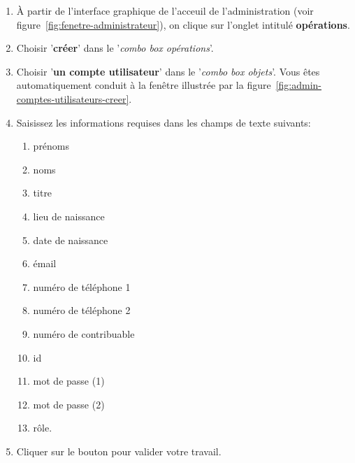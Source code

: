 \begin{enumerate}[1)]
	\item \`A partir de l'interface graphique de l'acceuil de
		l'administration (voir figure~\ref{fig:fenetre-administrateur}),
		on clique sur l'onglet intitul\'e \textbf{op\'erations}. 
		
	\item Choisir '\textbf{cr\'eer}' dans le '\emph{combo box
		op\'erations}'.
		
	\item Choisir '\textbf{un compte utilisateur}' dans
		le '\emph{combo box objets}'. Vous \^etes automatiquement
		conduit \`a la fen\^etre illustr\'ee par la
		figure~\ref{fig:admin-comptes-utilisateurs-creer}.
		
	\item Saisissez les informations requises dans les champs
		de texte suivants:
		\begin{enumerate}[1)]
			\item pr\'enoms
			\item noms
			\item titre			
			\item lieu de naissance \optionel
			\item date de naissance \optionel
			\item \'email \optionel
			\item num\'ero de t\'el\'ephone 1 \optionel
			\item num\'ero de t\'el\'ephone 2 \optionel
			\item num\'ero de contribuable \optionel
			\item id
			\item mot de passe (1)
			\item mot de passe (2)			
			\item r\^ole.
		\end{enumerate}
		
	\item Cliquer sur le bouton  pour
		valider votre travail.	
\end{enumerate}



\newpage
{}

